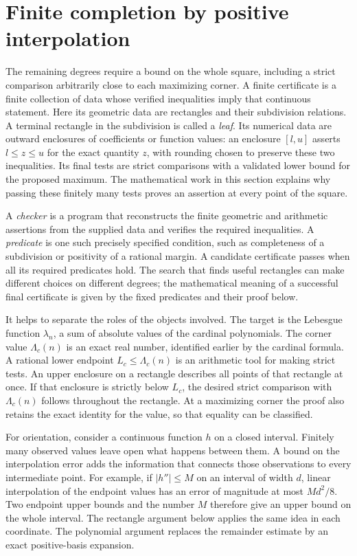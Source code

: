 \section{Finite completion by positive interpolation}
\label{sec:certificates}
The remaining degrees require a bound on the whole square, including a
strict comparison arbitrarily close to each maximizing corner.
A finite certificate is a finite collection of data whose verified
inequalities imply that continuous statement. Here its geometric data
are rectangles and their subdivision relations. A terminal rectangle in
the subdivision is called a \emph{leaf}. Its numerical data are outward
enclosures of coefficients or function values: an enclosure $[l,u]$
asserts $l\leq z\leq u$ for the exact quantity $z$, with rounding chosen
to preserve these two inequalities. Its final tests
are strict comparisons with a validated lower bound for the proposed
maximum. The mathematical work in this section explains why passing
these finitely many tests proves an assertion at every point of the
square.

A \emph{checker} is a program that reconstructs the finite geometric
and arithmetic assertions from the supplied data and verifies the
required inequalities. A \emph{predicate} is one such precisely
specified condition, such as completeness of a subdivision or
positivity of a rational margin. A candidate certificate passes when
all its required predicates hold. The search that finds useful
rectangles can make different choices on different degrees; the
mathematical meaning of a successful final certificate is given by
the fixed predicates and their proof below.

It helps to separate the roles of the objects involved. The target is the
Lebesgue function $\lambda_n$, a sum of absolute values of the cardinal
polynomials. The corner value $\Lambda_c(n)$ is an exact real number,
identified earlier by the cardinal formula. A rational lower endpoint
$L_c\leq\Lambda_c(n)$ is an arithmetic tool for making strict tests.
An upper enclosure on a rectangle describes all points of that rectangle
at once. If that enclosure is strictly below $L_c$, the desired strict
comparison with $\Lambda_c(n)$ follows throughout the rectangle. At a
maximizing corner the proof also retains the exact identity for the
value, so that equality can be classified.

For orientation, consider a continuous function $h$ on a closed
interval. Finitely many observed values leave open what happens between
them. A bound on the interpolation error adds the information that
connects those observations to every intermediate point. For example,
if $|h''|\leq M$ on an interval of width $d$, linear interpolation of
the endpoint values has an error of magnitude at most $Md^2/8$.
Two endpoint upper bounds and the number $M$ therefore give an upper
bound on the whole interval. The rectangle argument below applies the
same idea in each coordinate. The polynomial argument replaces the
remainder estimate by an exact positive-basis expansion.

